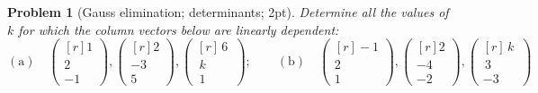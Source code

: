\documentclass[12pt,a4]{article}
\newtheorem{problem}{Problem}
\begin{document}
\begin{problem}[Gauss elimination; determinants; 2pt]\rm 
	Determine all the values of~$k$ for which the column vectors below are linearly dependent:
	\begin{equation*}
	\mathrm{(a)}\quad
	\begin{pmatrix}[r]
	1 \\ 2 \\ -1
	\end{pmatrix},
	\begin{pmatrix}[r]
	2 \\ -3 \\ 5
	\end{pmatrix},
	\begin{pmatrix}[r]
	\,6\, \\ \,k\, \\ \,1\,
	\end{pmatrix};
	\qquad
	\mathrm{(b)}\quad \begin{pmatrix}[r]
	-1 \\ 2 \\1
	\end{pmatrix},
	\begin{pmatrix}[r]
	2 \\ -4 \\ -2
	\end{pmatrix},
	\begin{pmatrix}[r]
	\,k\, \\ \,3\, \\ -3\,
	\end{pmatrix}
	\end{equation*}
\end{problem}
\end{document}
